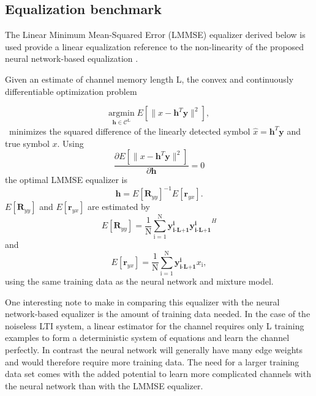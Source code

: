 \subsection{Equalization benchmark}
The Linear Minimum Mean-Squared Error (LMMSE) equalizer derived below is used provide a linear equalization reference to the non-linearity of the proposed neural network-based equalization .
\par
Given an estimate of channel memory length L, the convex and continuously differentiable optimization problem 

\begin{equation*}\label{mmse}
\underset{\mathbf{\mathbf{h}} \in \textit{$\mathcal{C}^{\text{L}}$}}{\text{argmin}} \;
 E[\|x-\mathbf{h}^T\mathbf{y}\|^2],
\end{equation*}\
minimizes the squared difference of the linearly detected symbol $\hat{x}= \mathbf{h}^T\mathbf{y}$ and true symbol $x$.
Using
\begin{equation*}\label{mmse}
\frac{\partial  E[\|x-\mathbf{h}^T\mathbf{y}\|^2]}{\partial \mathbf{h} } = 0
\end{equation*}
the optimal LMMSE equalizer is \cite{proakis1988introduction}
\begin{equation*}\label{mmse}
\mathbf{h} = E[\mathbf{R}_{yy}]^{-1}E[\mathbf{r}_{yx}].
\end{equation*}
$E[\mathbf{R}_{yy}]$ and $E[\mathbf{r}_{yx}]$ are estimated by
\begin{equation*}\label{mmse}
 E[\mathbf{R}_{yy}]= \frac{1}{\mathrm{N}}\sum_{\mathrm{i=1}}^{\mathrm{N}}
\mathbf{y^{\text{i}}_{\text{i-L+1}}}\mathbf{y^{\text{i}}_{\text{i-L+1}}}^H
 \end{equation*}
 and
\begin{equation*}\label{mmse}
E[\mathbf{r}_{yx}]= \frac{1}{\mathrm{N}}\sum_{\mathrm{i=1}}^{\mathrm{N}}
\mathbf{y^{\text{i}}_{\text{i-L+1}}}x_{\text{i}},
 \end{equation*}
 using the same training data as the neural network and mixture model. 
 
\par
One interesting note to make in comparing this equalizer with the neural network-based equalizer is the amount of training data needed. In the case of the noiseless LTI system, a linear estimator for the channel requires only L training examples to form a deterministic system of equations and learn the channel perfectly. In contrast the neural network will generally have many edge weights and would therefore require more training data. The need for a larger training data set comes with the added potential to learn more complicated channels with the neural network than with the LMMSE equalizer.
 
